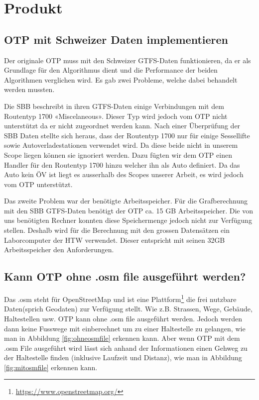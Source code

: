 \section{Produkt}

\subsection{OTP mit Schweizer Daten implementieren}
Der originale OTP muss mit den Schweizer GTFS-Daten funktionieren, da er als Grundlage für den Algorithmus dient und die Performance der beiden Algorithmen verglichen wird. Es gab zwei Probleme, welche dabei behandelt werden mussten.
\newline

Die SBB beschreibt in ihren GTFS-Daten einige Verbindungen mit dem Routentyp 1700 «Miscelaneous». Dieser Typ wird jedoch vom OTP nicht unterstützt da er nicht zugeordnet werden kann. Nach einer Überprüfung der SBB Daten stellte sich heraus, dass der Routentyp 1700 nur für einige Sessellifte sowie Autoverladestationen verwendet wird. Da diese beide nicht in unserem Scope liegen können sie ignoriert werden. Dazu fügten wir dem OTP einen Handler für den Routentyp 1700 hinzu welcher ihn als Auto definiert. Da das Auto kein ÖV ist liegt es ausserhalb des Scopes unserer Arbeit, es wird jedoch vom OTP unterstützt.
\newline


Das zweite Problem war der benötigte Arbeitsspeicher. Für die Grafberechnung mit den SBB GTFS-Daten benötigt der OTP ca. 15 GB Arbeitsspeicher. Die von uns benötigten Rechner konnten diese Speichermenge jedoch nicht zur Verfügung stellen. Deshalb wird für die Berechnung mit den grossen Datensätzen ein Laborcomputer der HTW verwendet. Dieser entspricht mit seinen 32GB Arbeitsspeicher den Anforderungen.


\subsection{Kann OTP ohne .osm file ausgeführt werden?}
Das .osm steht für OpenStreetMap und ist eine Plattform\footnote{\url{https://www.openstreetmap.org/}} die frei nutzbare Daten(sprich Geodaten) zur Verfügung stellt. Wie z.B. Strassen, Wege, Gebäude, Haltestellen usw. OTP kann ohne .osm file ausgeführt werden. Jedoch werden dann keine Fusswege mit einberechnet um zu einer Haltestelle zu gelangen, wie man in Abbildung \ref{fig:ohneosmfile} erkennen kann.
Aber wenn OTP mit dem .osm File ausgeführt wird lässt sich anhand der Informationen einen Gehweg zu der Haltestelle finden (inklusive Laufzeit und Distanz), wie man in Abbildung \ref{fig:mitosmfile} erkennen kann. 

